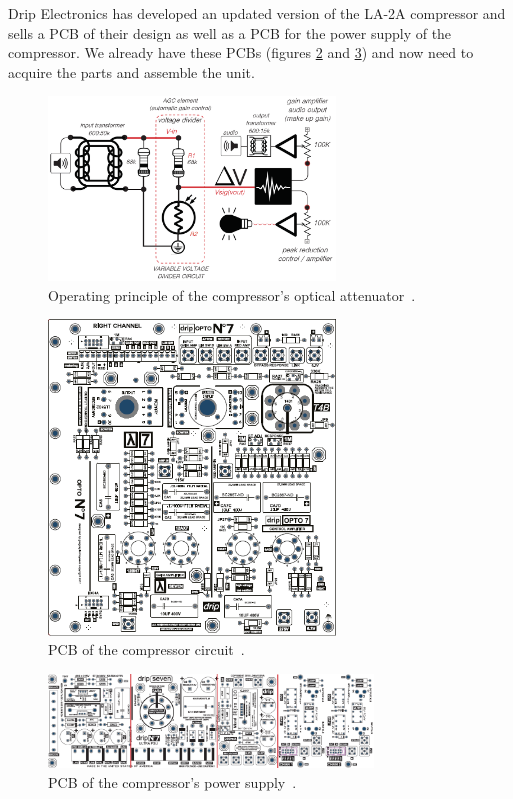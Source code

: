 \documentclass[journal]{IEEEtran}
\begin{document}
	Drip Electronics has developed an updated version of the LA-2A compressor and sells a PCB of their design as well as a PCB for the power supply of the compressor. We already have these PCBs (figures \ref{fig:opto7pcb} and \ref{fig:opto7powerpcb}) and now need to acquire the parts and assemble the unit.
	
	\begin{figure}
		\centering
		\includegraphics[width=3in]{OpticalAttenuator}
		\caption{Operating principle of the compressor's optical attenuator~\cite{opto7}. }
		\label{fig:OpticalAttenuator}
	\end{figure}
	
	
	\begin{figure}
		\centering
		\includegraphics[width=3in]{opto7pcb}
		\caption{PCB of the compressor circuit~\cite{opto7}. }
		\label{fig:opto7pcb}
	\end{figure}

	\begin{figure}
		\centering
		\includegraphics[width=3.4in]{opto7powerpcb}
		\caption{PCB of the compressor's power supply~\cite{opto7}. }
		\label{fig:opto7powerpcb}
	\end{figure}
	
\end{document}
